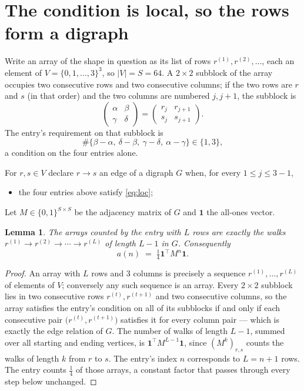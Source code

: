 \documentclass[11pt,a4paper]{article}
\theoremstyle{plain}
\newtheorem{lemma}[theorem]{Lemma}
\theoremstyle{definition}
\begin{document}
\section{The condition is local, so the rows form a digraph}

Write an array of the shape in question as its list of rows
$r^{(1)},r^{(2)},\dots$, each an element of
$V=\{0,1,\dots,3\}^{3}$, so $|V|=S=64$. A $2\times2$ subblock of the array
occupies two consecutive rows and two consecutive columns; if the two rows are $r$
and $s$ (in that order) and the two columns are numbered $j,j+1$,
the subblock is
\[
\begin{pmatrix}\alpha&\beta\\\gamma&\delta\end{pmatrix}=\begin{pmatrix}r_j&r_{j+1}\\s_j&s_{j+1}\end{pmatrix}.
\]
The entry's requirement on that subblock is
\begin{equation}\label{eq:loc}
\#\{\beta-\alpha,\ \delta-\beta,\ \gamma-\delta,\ \alpha-\gamma\}\in\{1,3\},
\end{equation}
a condition on the four entries alone.

For $r,s\in V$ declare $r\to s$ an edge of a digraph $G$ when, for every
$1\le j\le 3-1$,
\begin{itemize}
\item the four entries above satisfy \eqref{eq:loc};

\end{itemize}
Let $M\in\{0,1\}^{S\times S}$ be the adjacency matrix of $G$ and $\mathbf{1}$ the
all-ones vector.

\begin{lemma}\label{lem:walk}
The arrays counted by the entry with $L$ rows are exactly the walks
$r^{(1)}\to r^{(2)}\to\cdots\to r^{(L)}$ of length $L-1$ in $G$. Consequently
\[
a(n)\;=\;\tfrac1{4}\mathbf{1}^{\!\top}M^{n}\mathbf{1} .
\]
\end{lemma}

\begin{proof}
An array with $L$ rows and $3$ columns is precisely a sequence
$r^{(1)},\dots,r^{(L)}$ of elements of $V$; conversely any such sequence is an array.
Every $2\times2$ subblock lies in two consecutive rows $r^{(t)},r^{(t+1)}$ and two
consecutive columns, so the array satisfies the entry's condition on all of its subblocks
if and only if each consecutive pair $\bigl(r^{(t)},r^{(t+1)}\bigr)$ satisfies it for
every column pair --- which is exactly the edge relation of $G$. The number of walks of
length $L-1$, summed over all starting and ending vertices, is
$\mathbf{1}^{\!\top}M^{L-1}\mathbf{1}$, since $(M^{k})_{r,s}$ counts the walks of
length $k$ from $r$ to $s$. The entry's index $n$ corresponds to $L=n+1$ rows. The entry counts $\tfrac1{4}$ of those arrays, a constant factor that passes through every step below unchanged.
\end{proof}
\end{document}

